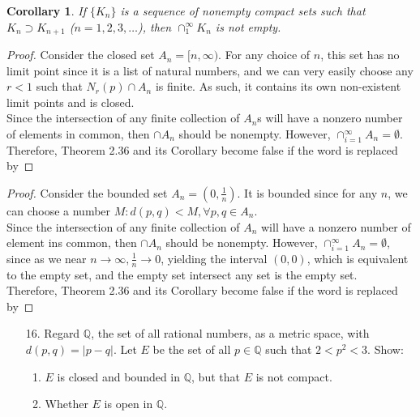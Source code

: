 \documentclass[10pt]{article}
\theoremstyle{definition}
\theoremstyle{plain}
\newtheorem*{corollary*}{Corollary}
\newcommand{\Q}{\mathbb{Q}}
\begin{document}
\begin{corollary*}
If $\{K_n\}$ is a sequence of nonempty compact sets such that $K_n \supset K_{n+1}$ ($n=1,2,3,\dots$), then $\cap_1^\infty K_n$ is not empty.
\end{corollary*}

\begin{proof}
Consider the closed set $A_n=[n,\infty)$. For any choice of $n$, this set has no limit point since it is a list of natural numbers, and we can very easily choose any $r < 1$ such that $N_r(p)\cap A_n$ is finite. As such, it contains its own non-existent limit points and is closed. \\

Since the intersection of any finite collection of $A_n$s will have a nonzero number of elements in common, then $\cap A_n$ should be nonempty. However, $\cap_{i=1}^\infty A_n = \emptyset$. \\

Therefore, Theorem 2.36 and its Corollary become false if the word  is replaced by 
\end{proof}

\begin{proof}
Consider the bounded set $A_n = (0, \frac{1}{n})$. It is bounded since for any $n$, we can choose a number $M: d(p,q) < M, \forall p,q\in A_n$. \\

Since the intersection of any finite collection of $A_n$ will have a nonzero number of element ins common, then $\cap A_n$ should be nonempty. However, $\cap_{i=1}^\infty A_n = \emptyset$, since as we near $n\rightarrow\infty, \frac{1}{n}\rightarrow 0$, yielding the interval $(0,0)$, which is equivalent to the empty set, and the empty set intersect any set is the empty set. \\

Therefore, Theorem 2.36 and its Corollary become false if the word  is replaced by 
\end{proof}




\pagebreak



\begin{enumerate}
\item[16.] Regard $\Q$, the set of all rational numbers, as a metric space, with $d(p,q)=|p-q|$. Let $E$ be the set of all $p\in \Q$ such that $2<p^2<3$. Show:
\begin{enumerate}
\item $E$ is closed and bounded in $\Q$, but that $E$ is not compact.
\item Whether $E$ is open in $\Q$.
\end{enumerate}
\end{enumerate}
\end{document}
